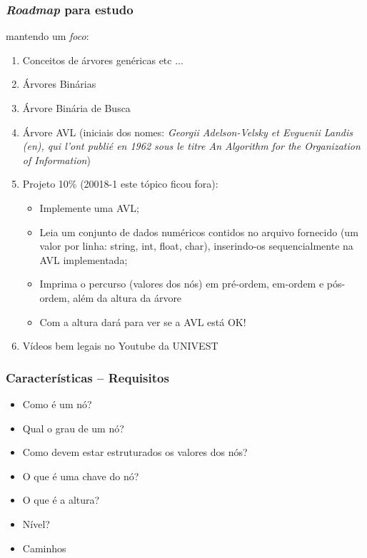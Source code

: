 \begin{frame}
    \frametitle{\textit{Roadmap} para estudo}
    
\begin{block}{mantendo um \textit{foco}:}

\begin{enumerate}
  \item Conceitos de árvores genéricas etc ... 
    \item Árvores Binárias
  \item Árvore Binária de Busca
   \item Árvore AVL (iniciais dos nomes:  \textit{Georgii Adelson-Velsky et Evguenii Landis (en), 
   qui l'ont publié en 1962 sous le titre An Algorithm for the Organization of Information})
 
   \item Projeto 10\%  (20018-1 este tópico ficou fora): 
   \begin{itemize}
     \item  Implemente uma AVL;
    \item   Leia um conjunto de dados numéricos contidos no arquivo fornecido (um valor por linha: string, int, float, char), inserindo-os sequencialmente na AVL implementada;
    \item   Imprima o percurso (valores dos nós) em pré-ordem, em-ordem e pós-ordem, além da altura da árvore
    \item   Com a altura dará para ver se a AVL está OK!
   \end{itemize}
  
  \item Vídeos bem legais no Youtube da UNIVEST
  
\end{enumerate}


\end{block}



    \end{frame}

\begin{frame}
    \frametitle{Características -- Requisitos}
    
\begin{itemize}
  
  \item  Como é um nó?
  \item  Qual o grau de um nó?
  \item  Como devem estar estruturados os valores dos nós?
  \item  O que é uma chave do nó?
  \item  O que é a altura?
  \item  Nível?
  \item  Caminhos

\end{itemize}


\end{frame}

